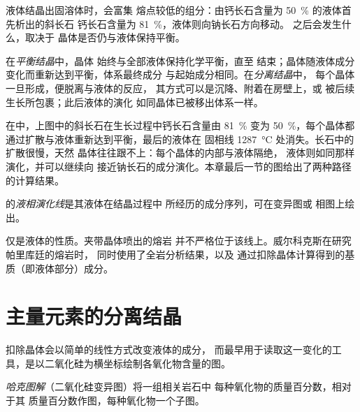 液体结晶出固溶体时，会富集
熔点较低的组分：由钙长石含量为 \qty{50}{\percent} 的液体首先析出的斜长石
钙长石含量为 \qty{81}{\percent}，液体则向钠长石方向移动。
之后会发生什么，取决于
晶体是否仍与液体保持平衡。

\begin{definition}[平衡结晶与分离结晶]
\label{def:b2:magmatic-differentiation:crystallisation}
在\emph{平衡结晶}中，晶体
始终与全部液体保持化学平衡，直至
结束；晶体随液体成分变化而重新达到平衡，体系最终成分
与起始成分相同。在\emph{分离结晶}中，
每个晶体一旦形成，便脱离与液体的反应，
其方式可以是沉降、附着在房壁上，或
被后续生长所包裹；此后液体的演化
如同晶体已被移出体系一样。
\end{definition}

在中，上图中的斜长石在生长过程中钙长石含量由
\qty{81}{\percent} 变为 \qty{50}{\percent}，每个晶体都
通过扩散与液体重新达到平衡，最后的液体在
固相线 \qty{1287}{\celsius} 处消失。长石中的扩散很慢，天然
晶体往往跟不上：每个晶体的内部与液体隔绝，
液体则如同那样演化，并可以继续向
接近钠长石的成分演化。本章最后一节的图给出了两种路径的计算结果。

\begin{definition}[液相演化线]\label{def:b2:magmatic-differentiation:lld}
的\emph{液相演化线}是其液体在结晶过程中
所经历的成分序列，可在变异图或
相图上绘出。
\end{definition}

仅是液体的性质。夹带晶体喷出的熔岩
并不严格位于该线上。威尔科克斯在研究帕里库廷的熔岩时，
同时使用了全岩分析结果，以及
通过扣除晶体计算得到的基质（即液体部分）成分。

\section{主量元素的分离结晶}\label{sec:b2:magmatic-differentiation:majors}

扣除晶体会以简单的线性方式改变液体的成分，
而最早用于读取这一变化的工具，是以二氧化硅为横坐标绘制各氧化物含量的图。

\begin{definition}[哈克图解]\label{def:b2:magmatic-differentiation:harker}
\emph{哈克图解}（二氧化硅变异图）将一组相关岩石中
每种氧化物的质量百分数，相对于其
 质量百分数作图，每种氧化物一个子图。
\end{definition}



